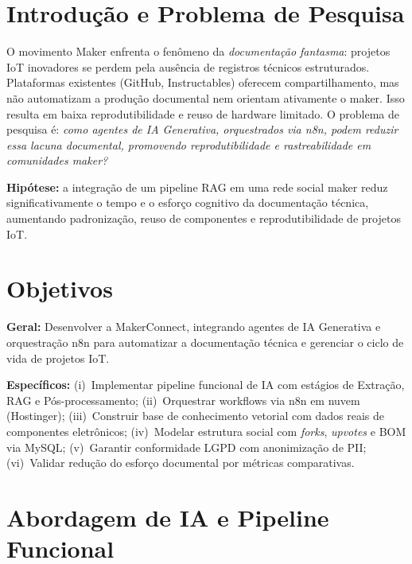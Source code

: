 \documentclass[portuguese]{sbcreviews-2025}%
\begin{document}
\section{Introdução e Problema de Pesquisa}

O movimento Maker enfrenta o fenômeno da \textit{documentação fantasma}: projetos IoT inovadores se perdem pela ausência de registros técnicos estruturados. Plataformas existentes (GitHub, Instructables) oferecem compartilhamento, mas não automatizam a produção documental nem orientam ativamente o maker. Isso resulta em baixa reprodutibilidade e reuso de hardware limitado. O problema de pesquisa é: \textit{como agentes de IA Generativa, orquestrados via n8n, podem reduzir essa lacuna documental, promovendo reprodutibilidade e rastreabilidade em comunidades maker?}

\textbf{Hipótese:} a integração de um pipeline RAG em uma rede social maker reduz significativamente o tempo e o esforço cognitivo da documentação técnica, aumentando padronização, reuso de componentes e reprodutibilidade de projetos IoT.

\section{Objetivos}

\textbf{Geral:} Desenvolver a MakerConnect, integrando agentes de IA Generativa e orquestração n8n para automatizar a documentação técnica e gerenciar o ciclo de vida de projetos IoT.

\textbf{Específicos:} (i)~Implementar pipeline funcional de IA com estágios de Extração, RAG e Pós-processamento; (ii)~Orquestrar workflows via n8n em nuvem (Hostinger); (iii)~Construir base de conhecimento vetorial com dados reais de componentes eletrônicos; (iv)~Modelar estrutura social com \textit{forks}, \textit{upvotes} e BOM via MySQL; (v)~Garantir conformidade LGPD com anonimização de PII; (vi)~Validar redução do esforço documental por métricas comparativas.

\section{Abordagem de IA e Pipeline Funcional}
\end{document}
